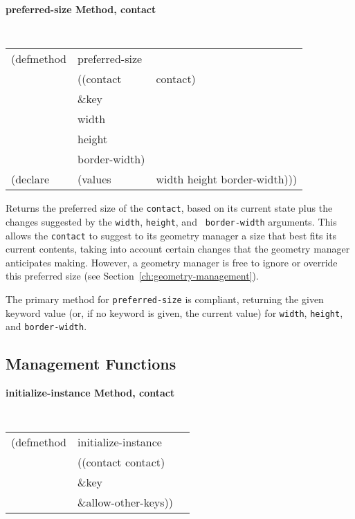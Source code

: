 {\samepage
{\large {\bf preferred-size \hfill Method, contact}}
\begin{flushright}
\parbox[t]{6.125in}{
\tt
\begin{tabular}{lll}
\raggedright
(defmethod & preferred-size & \\
& ((contact  &contact)\\
& \&key\\
&  width \\
&  height\\
&  border-width) \\
(declare & (values & width height border-width)))
\end{tabular}
\rm}
\end{flushright}
}

\begin{flushright}\parbox[t]{6.125in}{
Returns the preferred size of the {\tt contact}, based on its current state
plus the changes suggested by the {\tt width}, {\tt height}, and {\tt
border-width} arguments. This allows the {\tt contact} to suggest to its geometry
manager a size that best fits its current contents, taking into account
certain changes that the geometry manager anticipates making. However, a
geometry manager
is free to ignore or override this preferred size (see Section~\ref{ch:geometry-management}).}
\end{flushright}

\begin{flushright}\parbox[t]{6.125in}{
The primary method for {\tt preferred-size} is compliant, returning the
given keyword value (or, if no keyword is given, the current value) for {\tt width},
{\tt height}, and {\tt border-width}.}\end{flushright}

{\samepage
\subsection*{Management Functions}
{\large {\bf initialize-instance \hfill Method, contact}}
\begin{flushright} \parbox[t]{6.125in}{
\tt
\begin{tabular}{lll}
\raggedright
(defmethod & initialize-instance & \\
& ((contact  contact)\\
& \&key \\
& \&allow-other-keys))
\end{tabular}
\rm

}\end{flushright}
}

